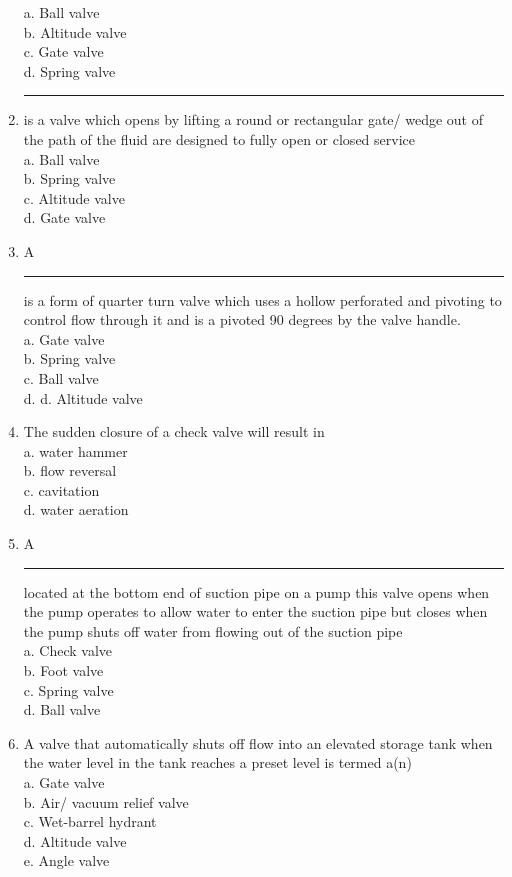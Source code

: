 \begin{enumerate}[1.]
a.	Ball valve\\
b.	Altitude valve\\
c.	Gate valve\\
d.	Spring valve\\

\item \rule{9mm}{.1pt} is a valve which opens by lifting a round or rectangular gate/ wedge out of the path of the fluid are designed to fully open or closed service\\

a.	Ball valve\\
b.	Spring valve\\
c.	Altitude valve\\
d.	Gate valve\\

\item A \rule{9mm}{.1pt} is a form of quarter turn valve which uses a hollow perforated and pivoting to control flow through it and is a pivoted 90 degrees by the valve handle.\\
a.	Gate valve\\
b.	Spring valve\\
c.	Ball valve\\
d.	d.  Altitude valve

\item The sudden closure of a check valve will result in\\
a.	water hammer\\
b.	flow reversal\\
c.	cavitation\\
d.	water aeration\\

\item A \rule{9mm}{.1pt} located at the bottom end of suction pipe on a pump this valve opens when the pump operates to allow water to enter the suction pipe but closes when the pump shuts off water from flowing out of the suction pipe\\
a.	Check valve\\
b.	Foot valve\\
c. 	Spring valve\\
d.	Ball valve

\item A valve that automatically shuts off flow into an elevated storage tank when the water level in the tank reaches a preset level is termed a(n)\\
a.	Gate valve\\
b.	Air/ vacuum relief valve\\
c.	Wet-barrel hydrant\\
d.	Altitude valve\\
e.	Angle valve


\end{enumerate}
